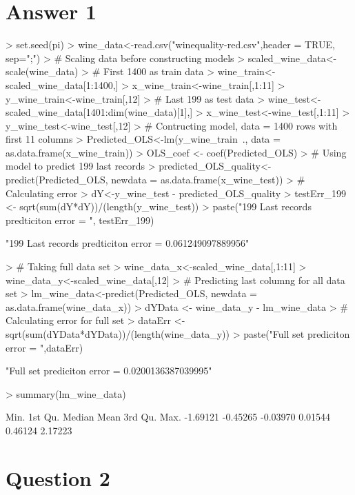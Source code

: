 \documentclass{article}
\begin{document}
\section*{Answer  1}
\begin{Schunk}
\begin{Sinput}
> set.seed(pi)
> wine_data<-read.csv("winequality-red.csv",header = TRUE, sep=";")
> # Scaling data before constructing models
> scaled_wine_data<-scale(wine_data)
> # First 1400 as train data
> wine_train<-scaled_wine_data[1:1400,]
> x_wine_train<-wine_train[,1:11]
> y_wine_train<-wine_train[,12]
> # Last 199 as test data
> wine_test<-scaled_wine_data[1401:dim(wine_data)[1],]
> x_wine_test<-wine_test[,1:11]
> y_wine_test<-wine_test[,12]
> # Contructing model, data = 1400 rows with first 11 columns
> Predicted_OLS<-lm(y_wine_train~., data = as.data.frame(x_wine_train))
> OLS_coef <- coef(Predicted_OLS)
> # Using model to predict 199 last records
> predicted_OLS_quality<-predict(Predicted_OLS, newdata = as.data.frame(x_wine_test))
> # Calculating error
> dY<-y_wine_test - predicted_OLS_quality
> testErr_199 <- sqrt(sum(dY*dY))/(length(y_wine_test))	
> paste("199 Last records predticiton error = ", testErr_199)
\end{Sinput}
\begin{Soutput}
[1] "199 Last records predticiton error =  0.061249097889956"
\end{Soutput}
\begin{Sinput}
> # Taking full data set
> wine_data_x<-scaled_wine_data[,1:11]
> wine_data_y<-scaled_wine_data[,12]
> # Predicting last columng for all data set
> lm_wine_data<-predict(Predicted_OLS, newdata = as.data.frame(wine_data_x))
> dYData <- wine_data_y - lm_wine_data
> # Calculating error for full set
> dataErr <- sqrt(sum(dYData*dYData))/(length(wine_data_y))
> paste("Full set prediciton error = ",dataErr)
\end{Sinput}
\begin{Soutput}
[1] "Full set prediciton error =  0.0200136387039995"
\end{Soutput}
\begin{Sinput}
> summary(lm_wine_data)
\end{Sinput}
\begin{Soutput}
    Min.  1st Qu.   Median     Mean  3rd Qu.     Max. 
-1.69121 -0.45265 -0.03970  0.01544  0.46124  2.17223 
\end{Soutput}
\end{Schunk}

\section*{Question 2}
\end{document}
